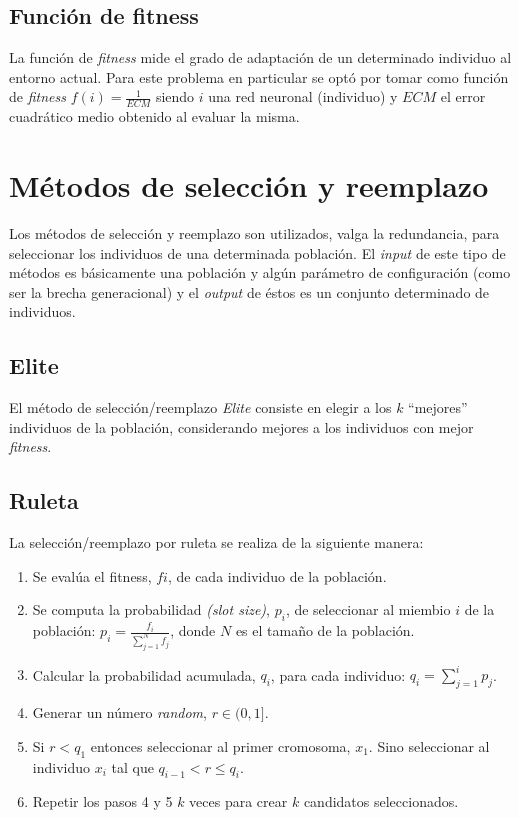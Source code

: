 \documentclass[%
    final,
    reprint,
    notitlepage,
    narroweqnarray,
    inline,
    twoside,
    invited
    ]{ieee}
\begin{document}
\subsection{Función de fitness}

\par La función de \textit{fitness} mide el grado de adaptación de un determinado individuo al entorno actual. Para este problema en particular se optó por tomar como función de \textit{fitness} $f(i) = \frac{1}{ECM}$ siendo $i$ una red neuronal (individuo) y $ECM$ el error cuadrático medio obtenido al evaluar la misma.

\section{Métodos de selección y reemplazo}

\par Los métodos de selección y reemplazo son utilizados, valga la redundancia, para seleccionar los individuos de una determinada población. El \textit{input} de este tipo de métodos es básicamente una población y algún parámetro de configuración (como ser la brecha generacional) y el \textit{output} de éstos es un conjunto determinado de individuos.

\subsection{Elite}

\par El método de selección/reemplazo \textit{Elite} consiste en elegir a los $k$ ``mejores'' individuos de la población, considerando mejores a los individuos con mejor \textit{fitness}.

\subsection{Ruleta}

\par La selección/reemplazo por ruleta se realiza de la siguiente manera:\\

\begin{enumerate}

\item Se evalúa el fitness, $fi$, de cada individuo de la población.
\item Se computa la probabilidad \textit{(slot size)}, $p_i$, de seleccionar al miembio $i$ de la población:	$p_i=\frac{f_i}{\sum_{j=1}^{N}{f_j}}$, donde $N$ es el tamaño de la población.
\item Calcular la probabilidad acumulada, $q_i$, para cada individuo: $q_i=\sum_{j=1}^{i}{p_j}$.
\item Generar un número \textit{random}, $r \in (0, 1]$.
\item Si $r < q_1$ entonces seleccionar al primer cromosoma, $x_1$. Sino seleccionar al individuo $x_i$ tal que $q_{i-1} < r \leq q_i$. 
\item Repetir los pasos 4 y 5 $k$ veces para crear $k$ candidatos seleccionados.
\end{enumerate}
\end{document}
